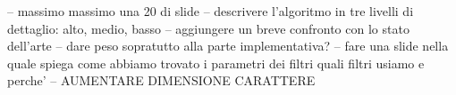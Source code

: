 
-- massimo massimo una 20 di slide
-- descrivere l'algoritmo in tre livelli di dettaglio:
    alto, medio, basso
-- aggiungere un breve confronto con lo stato dell'arte
-- dare peso sopratutto alla parte implementativa?
-- fare una slide nella quale spiega come abbiamo trovato i parametri dei filtri
   quali filtri usiamo e perche'
-- AUMENTARE DIMENSIONE CARATTERE